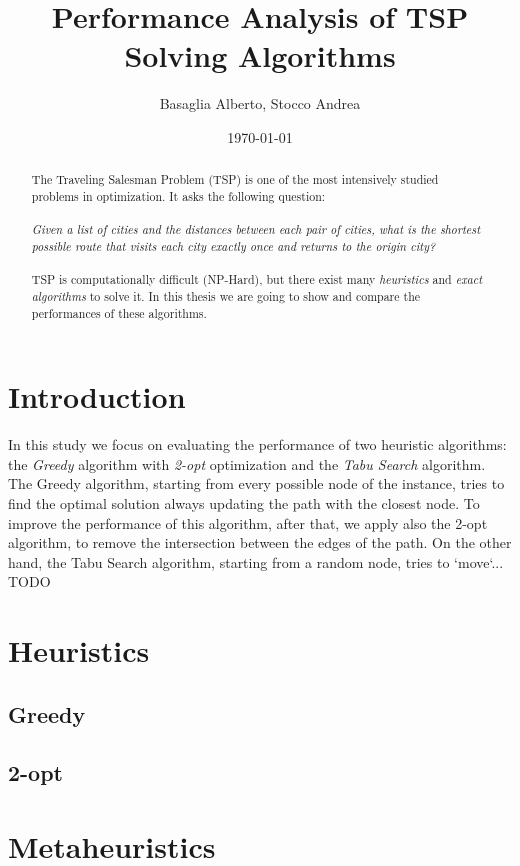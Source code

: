 \documentclass{article}
\title{Performance Analysis of TSP Solving Algorithms}
\author{Basaglia Alberto, Stocco Andrea}
\date{\today}
\begin{document}
\maketitle

\begin{abstract}
	The Traveling Salesman Problem (TSP) is one of the most intensively studied problems in optimization.
	It asks the following question:\\\\
	\textit{Given a list of cities and the distances between each pair of cities, what is the shortest possible route 
	that visits each city exactly once and returns to the origin city?}\\\\
	TSP is computationally difficult (NP-Hard), but there exist many \textit{heuristics} and \textit{exact algorithms} to solve it.
	In this thesis we are going to show and compare the performances of these algorithms. 
\end{abstract}

\section{Introduction}
In this study we focus on evaluating the performance of two heuristic algorithms: the \textit{Greedy} algorithm with \textit{2-opt} 
optimization and the \textit{Tabu Search} algorithm.
The Greedy algorithm, starting from every possible node of the instance, tries to find the optimal solution always updating the path
with the closest node. To improve the performance of this algorithm, after that, we apply also the 2-opt algorithm, to remove 
the intersection between the edges of the path.
On the other hand, the Tabu Search algorithm, starting from a random node, tries to `move`... TODO

\section{Heuristics}
\subsection{Greedy}
\subsection{2-opt}

\section{Metaheuristics}
\end{document}
